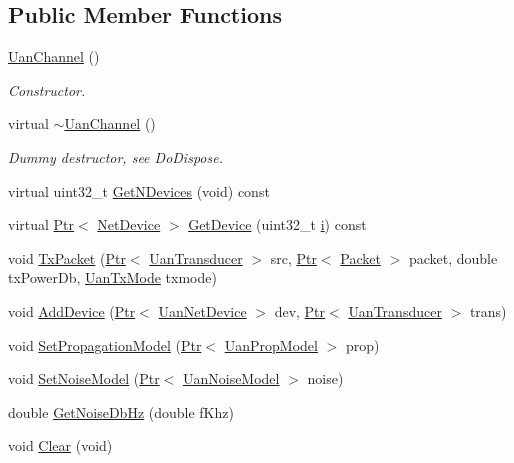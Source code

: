 \subsection*{Public Member Functions}
\begin{DoxyCompactItemize}
\item 
\hyperlink{classns3_1_1UanChannel_a389d840a6107b49f993eedf96de070d6}{Uan\+Channel} ()
\begin{DoxyCompactList}\small\item\em Constructor. \end{DoxyCompactList}\item 
virtual \hyperlink{classns3_1_1UanChannel_a81dfa476ec68749570a0c53dbc42bdbc}{$\sim$\+Uan\+Channel} ()
\begin{DoxyCompactList}\small\item\em Dummy destructor, see Do\+Dispose. \end{DoxyCompactList}\item 
virtual uint32\+\_\+t \hyperlink{classns3_1_1UanChannel_a6c746899f23ec70b94001187c84fc6f8}{Get\+N\+Devices} (void) const 
\item 
virtual \hyperlink{classns3_1_1Ptr}{Ptr}$<$ \hyperlink{classns3_1_1NetDevice}{Net\+Device} $>$ \hyperlink{classns3_1_1UanChannel_a52b94cfb4cc86a03805624976025dcb7}{Get\+Device} (uint32\+\_\+t \hyperlink{lte__uplink__power__control_8m_a6f6ccfcf58b31cb6412107d9d5281426}{i}) const 
\item 
void \hyperlink{classns3_1_1UanChannel_aaf9ea1b58b62a99e1c05c4732dcb5b55}{Tx\+Packet} (\hyperlink{classns3_1_1Ptr}{Ptr}$<$ \hyperlink{classns3_1_1UanTransducer}{Uan\+Transducer} $>$ src, \hyperlink{classns3_1_1Ptr}{Ptr}$<$ \hyperlink{classns3_1_1Packet}{Packet} $>$ packet, double tx\+Power\+Db, \hyperlink{classns3_1_1UanTxMode}{Uan\+Tx\+Mode} txmode)
\item 
void \hyperlink{classns3_1_1UanChannel_a37ebf48056f38523bbe6e03788764830}{Add\+Device} (\hyperlink{classns3_1_1Ptr}{Ptr}$<$ \hyperlink{classns3_1_1UanNetDevice}{Uan\+Net\+Device} $>$ dev, \hyperlink{classns3_1_1Ptr}{Ptr}$<$ \hyperlink{classns3_1_1UanTransducer}{Uan\+Transducer} $>$ trans)
\item 
void \hyperlink{classns3_1_1UanChannel_afcff666915f3e709b4348a3c61964bfc}{Set\+Propagation\+Model} (\hyperlink{classns3_1_1Ptr}{Ptr}$<$ \hyperlink{classns3_1_1UanPropModel}{Uan\+Prop\+Model} $>$ prop)
\item 
void \hyperlink{classns3_1_1UanChannel_a21a72e7cee8aa2eb5dda69c61b7d7fec}{Set\+Noise\+Model} (\hyperlink{classns3_1_1Ptr}{Ptr}$<$ \hyperlink{classns3_1_1UanNoiseModel}{Uan\+Noise\+Model} $>$ noise)
\item 
double \hyperlink{classns3_1_1UanChannel_a308161fd1cf5269d8a4cfc6b4ae3ed43}{Get\+Noise\+Db\+Hz} (double f\+Khz)
\item 
void \hyperlink{classns3_1_1UanChannel_a860ece3c3be3a72bf63b982ff1e2102a}{Clear} (void)
\end{DoxyCompactItemize}
